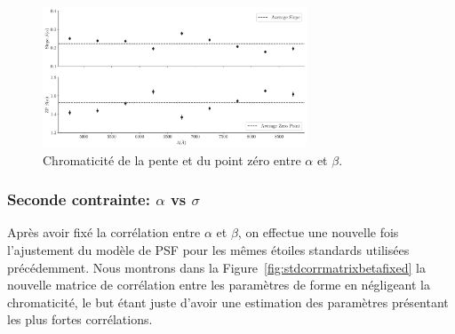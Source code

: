 \documentclass[../main/main.tex]{subfiles}
\begin{document}
\begin{figure}[ht]
  \centering
  \includegraphics[width=0.7\textwidth]{../figures/06_irf/chromaticitybeta_alpha_corr.pdf}
  \caption[Chromaticité de la pente et du point zéro entre $\alpha$ et $\beta$]{Chromaticité de la pente et du point zéro entre $\alpha$ et $\beta$.}
  \label{fig:chromslope_zp_alphabeta}
\end{figure}


\subsubsection{Seconde contrainte: $\alpha$ vs $\sigma$}


Après avoir fixé la corrélation entre $\alpha$ et $\beta$, on effectue
une nouvelle fois l'ajustement du modèle de PSF pour les mêmes étoiles
standards utilisées précédemment. Nous montrons dans la
Figure~\ref{fig:stdcorrmatrixbetafixed} la nouvelle matrice de
corrélation entre les paramètres de forme en négligeant la chromaticité,
le but étant juste d'avoir une estimation des paramètres présentant les
plus fortes corrélations.
\end{document}

